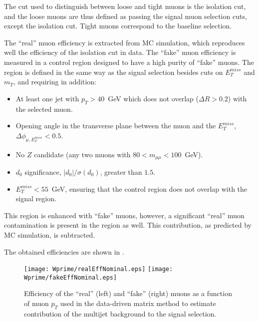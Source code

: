 The cut used to distinguish between loose and tight muons is the isolation cut, and the loose muons
are thus defined as passing the signal muon selection cuts, except the isolation cut. Tight muons correspond
to the baseline selection.

The ``real'' muon efficiency is extracted from MC simulation, which reproduces well the efficiency of the isolation cut in data. The ``fake'' muon efficiency is measured in a control region designed to have a high purity of ``fake'' muons. The region is defined in the same way as the signal selection besides cuts on $E_T^{miss}$ and $m_T$, and requiring in addition:
\begin{itemize}
\item At least one jet with $p_T > 40$~GeV which does not overlap ($\Delta R > 0.2$)
with the selected muon.
\item Opening angle in the transverse plane between the muon and the $E_T^{miss}$, $\Delta\phi_{\mu,E_T^{miss}} < 0.5$.
\item No $Z$ candidate (any two muons with $80 < m_{\mu\mu} < 100$~GeV).
\item $d_0$ significance, $|d_0|/\sigma(d_0)$, greater than $1.5$.
\item $E_T^{miss} < 55$~GeV, ensuring that the control region does not overlap with the signal region.
\end{itemize}
This region is enhanced with ``fake'' muons, however, a significant ``real'' muon contamination is present in the region as well. This contribution, as predicted by MC simulation, is subtracted.

The obtained efficiencies are shown in .
\begin{figure}[]
  \centering
  \texttt{[image: Wprime/realEffNominal.eps]}
  \texttt{[image: Wprime/fakeEffNominal.eps]}
  \caption{Efficiency of the ``real'' (left) and ``fake'' (right) muons as a function of muon $p_T$ used in the data-driven matrix method to estimate contribution of the multijet background to the signal selection.}
  \label{fig:matrix_method_efficiencies}
\end{figure}

